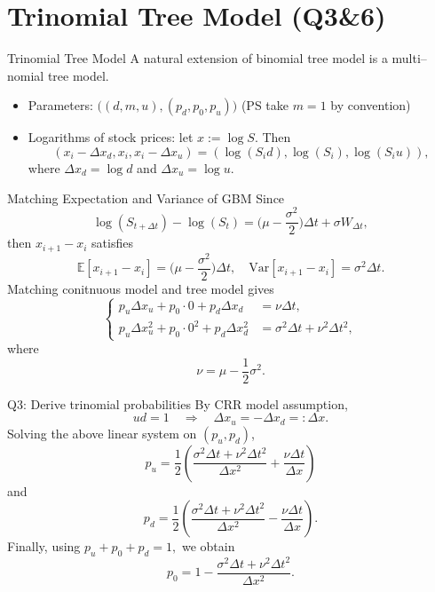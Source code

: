 \documentclass{beamer}
\newcommand{\bE}{\mathbb{E}}
\begin{document}
\section[TOPM]{Trinomial Tree Model (Q3\&6)}
\begin{frame}{Trinomial Tree Model}
A natural extension of binomial tree model is a multi–nomial tree model.
\begin{itemize}
    \item Parameters: $\big((d, m, u), (p_d, p_0, p_u)\big)$ (PS take $m=1$ by convention)
    \item Logarithms of stock prices: let $x := \log S$. Then \[
    (x_i - \Delta x_d, x_i, x_i - \Delta x_u) = (\log (S_id),\log(S_i), \log(S_i u) ),
    \]
    where $\Delta x_d = \log d$ and $\Delta x_u = \log u$.
\end{itemize}
\vspace{10pt}
\centering
{}
\end{frame}

\begin{frame}{Matching Expectation and Variance of GBM}
Since
\[
\log (S_{t+\Delta t}) - \log(S_t) = 
\big(\mu -\frac{\sigma^2}{2}\big) \Delta t + \sigma W_{\Delta t},
\]
then $x_{i+1} - x_i$ satisfies
\[
\bE[ x_{i+1} - x_i] = \big(\mu -\frac{\sigma^2}{2}\big) \Delta t,  \quad \mathrm{Var}[x_{i+1} - x_i] = \sigma ^2 \Delta t.
\]
Matching conitnuous model and tree model gives
\[
\begin{cases}
p_u\Delta x_u + p_0 \cdot0 +p_d\Delta x_d&=\nu\Delta t,\\[4pt]
p_u\Delta x_u^2+ p_0 \cdot 0^2 + p_d\Delta x_d^2
&=\sigma^2\Delta t+\nu^2\Delta t^2,
\end{cases}
\]
where
\[
\nu=\mu-\frac12\sigma^2.
\]
\end{frame}

\begin{frame}{Q3: Derive trinomial probabilities}
By CRR model assumption,
\[
ud=1
\quad\Longrightarrow\quad
\Delta x_u=-\Delta x_d=:\Delta x.
\]
Solving the above linear system on $(p_u, p_d)$,
\[
\boxed{
p_u
=
\frac12\left(
\frac{\sigma^2\Delta t+\nu^2\Delta t^2}{\Delta x^2}
+
\frac{\nu\Delta t}{\Delta x}
\right)
}
\]
and
\[
\boxed{
p_d
=
\frac12\left(
\frac{\sigma^2\Delta t+\nu^2\Delta t^2}{\Delta x^2}
-
\frac{\nu\Delta t}{\Delta x}
\right).
}
\]
Finally, using
\(
p_u+p_0+p_d=1,
\)
we obtain
\[
\boxed{
p_0
=
1-
\frac{\sigma^2\Delta t+\nu^2\Delta t^2}{\Delta x^2}.
}
\]    
\end{frame}
\end{document}
